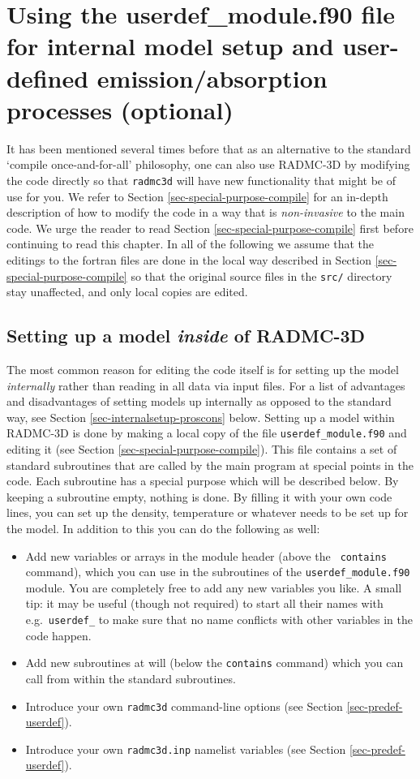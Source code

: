\documentclass{report}
\begin{document}
\chapter{Using the userdef\_module.f90 file for internal model setup and user-defined emission/absorption processes (optional)}
\label{chap-internal-setup}
%
It has been mentioned several times before that as an alternative to the
standard `compile once-and-for-all' philosophy, one can also use RADMC-3D by
modifying the code directly so that {\small\tt radmc3d} will have new
functionality that might be of use for you. We refer to Section
\ref{sec-special-purpose-compile} for an in-depth description of how to
modify the code in a way that is {\em non-invasive} to the main code. We
urge the reader to read Section \ref{sec-special-purpose-compile} first
before continuing to read this chapter. In all of the following we assume
that the editings to the fortran files are done in the local way described
in Section \ref{sec-special-purpose-compile} so that the original source
files in the {\small\tt src/} directory stay unaffected, and only local
copies are edited.

\section{Setting up a model {\em inside} of RADMC-3D}
The most common reason for editing the code itself is for setting up the
model {\em internally} rather than reading in all data via input files. For
a list of advantages and disadvantages of setting models up internally as
opposed to the standard way, see Section \ref{sec-internalsetup-proscons}
below. Setting up a model within RADMC-3D is done by making a local copy of
the file {\small\tt userdef\_module.f90} and editing it (see Section
\ref{sec-special-purpose-compile}). This file contains a set of standard
subroutines that are called by the main program at special points in the
code. Each subroutine has a special purpose which will be described below.
By keeping a subroutine empty, nothing is done. By filling it with your own
code lines, you can set up the density, temperature or whatever needs to be
set up for the model. In addition to this you can do the following as well:
\begin{itemize}
\item Add new variables or arrays in the module header (above the {\small\tt
    contains} command), which you can use in the subroutines of the
  {\small\tt userdef\_module.f90} module. You are completely free to add any
  new variables you like. A small tip: it may be useful (though not
  required) to start all their names with e.g.\ {\small\tt userdef\_} to
  make sure that no name conflicts with other variables in the code happen.
\item Add new subroutines at will (below the {\small\tt contains} command)
  which you can call from within the standard subroutines. 
\item Introduce your own {\small\tt radmc3d} command-line options (see
  Section \ref{sec-predef-userdef}).
\item Introduce your own {\small\tt radmc3d.inp} namelist variables
  (see Section \ref{sec-predef-userdef}). 
\end{itemize}
\end{document}
